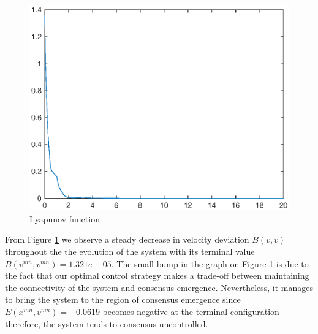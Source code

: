 \documentclass[a4paper,10pt, english]{article}
\begin{document}
 
 \begin{figure}[ht]
 \centering
 \includegraphics[scale=0.5]{figures/V5aT=20ndT=40lf.eps}
 \caption{Lyapunov function}
 \label{lf}
 \end{figure}
 
 \newpage
 From Figure \ref{lf} we observe a steady decrease in velocity deviation $B(v, v)$ throughout the the evolution of the system with its terminal value $B(v^{mn}, v^{mn}) = 1.321e-05$.
 The small bump in the graph on Figure \ref{lf} is due to the fact that our optimal control strategy makes  a trade-off between maintaining the connectivity of the system and consensus emergence. 
 Nevertheless, it manages to bring the system to the region of consensus emergence since $E(x^{mn}, v^{mn}) = -0.0619$ becomes negative at the terminal configuration therefore, the system 
 tends to consensus uncontrolled.
 
\end{document}
